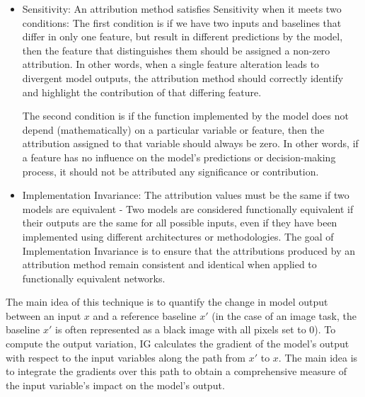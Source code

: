 \begin{itemize}
    \item Sensitivity:
An attribution method satisfies Sensitivity when it meets two conditions:
The first condition is if we have two inputs and baselines that differ in only one feature, but result in different predictions by the model, then the feature that distinguishes them should be assigned a non-zero attribution. In other words, when a single feature alteration leads to divergent model outputs, the attribution method should correctly identify and highlight the contribution of that differing feature.

The second condition is if the function implemented by the model does not depend (mathematically) on a particular variable or feature, then the attribution assigned to that variable should always be zero. In other words, if a feature has no influence on the model's predictions or decision-making process, it should not be attributed any significance or contribution.
    
    \item Implementation Invariance: The attribution values must be the same if two models are equivalent - Two models are considered functionally equivalent if their outputs are the same for all possible inputs, even if they have been implemented using different architectures or methodologies. The goal of Implementation Invariance is to ensure that the attributions produced by an attribution method remain consistent and identical when applied to functionally equivalent networks.
\end{itemize}

The main idea of this technique is to quantify the change in model output between an input $x$ and a reference baseline $x'$ (in the case of an image task, the baseline $x'$ is often represented as a black image with all pixels set to 0). To compute the output variation, IG calculates the gradient of the model's output with respect to the input variables along the path from $x'$ to $x$. The main idea is to integrate the gradients over this path to obtain a comprehensive measure of the input variable's impact on the model's output.

